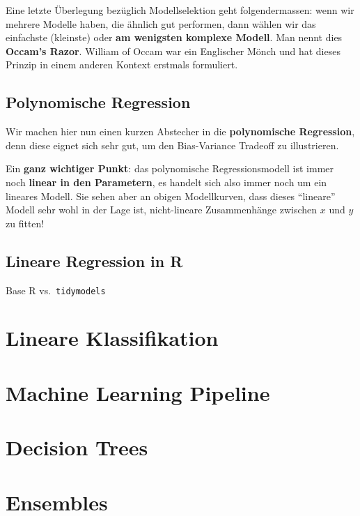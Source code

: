 \documentclass[
]{book}
\begin{document}
Eine letzte Überlegung bezüglich Modellselektion geht folgendermassen: wenn wir mehrere Modelle haben, die ähnlich gut performen, dann wählen wir das einfachste (kleinste) oder \textbf{am wenigsten komplexe Modell}. Man nennt dies \textbf{Occam's Razor}. William of Occam war ein Englischer Mönch und hat dieses Prinzip in einem anderen Kontext erstmals formuliert.

\hypertarget{polynomische-regression}{%
\section{Polynomische Regression}\label{polynomische-regression}}

Wir machen hier nun einen kurzen Abstecher in die \textbf{polynomische Regression}, denn diese eignet sich sehr gut, um den Bias-Variance Tradeoff zu illustrieren.

Ein \textbf{ganz wichtiger Punkt}: das polynomische Regressionsmodell ist immer noch \textbf{linear in den Parametern}, es handelt sich also immer noch um ein lineares Modell. Sie sehen aber an obigen Modellkurven, dass dieses ``lineare'' Modell sehr wohl in der Lage ist, nicht-lineare Zusammenhänge zwischen \(x\) und \(y\) zu fitten!

\hypertarget{lineare-regression-in-r}{%
\section{Lineare Regression in R}\label{lineare-regression-in-r}}

Base R vs.~\texttt{tidymodels}

\hypertarget{lin-class}{%
\chapter{Lineare Klassifikation}\label{lin-class}}

\hypertarget{ml-pipeline}{%
\chapter{Machine Learning Pipeline}\label{ml-pipeline}}

\hypertarget{trees}{%
\chapter{Decision Trees}\label{trees}}

\hypertarget{ensembles}{%
\chapter{Ensembles}\label{ensembles}}
\end{document}
